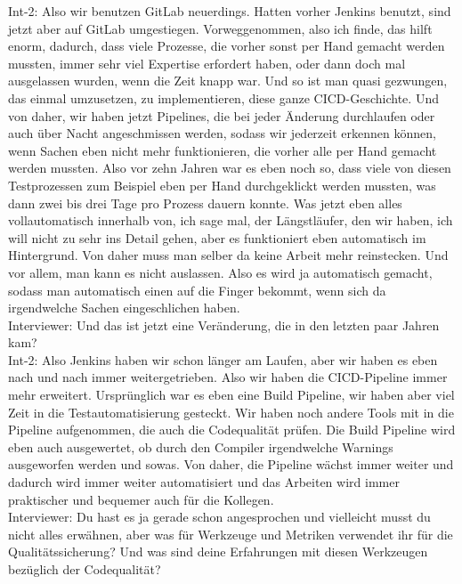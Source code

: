 Int-2: Also wir benutzen GitLab neuerdings. Hatten vorher Jenkins benutzt, sind jetzt aber auf GitLab umgestiegen. Vorweggenommen, also ich finde, das hilft enorm, dadurch, dass viele Prozesse, die vorher sonst per Hand gemacht werden mussten, immer sehr viel Expertise erfordert haben, oder dann doch mal ausgelassen wurden, wenn die Zeit knapp war. Und so ist man quasi gezwungen, das einmal umzusetzen, zu implementieren, diese ganze CICD-Geschichte. Und von daher, wir haben jetzt Pipelines, die bei jeder Änderung durchlaufen oder auch über Nacht angeschmissen werden, sodass wir jederzeit erkennen können, wenn Sachen eben nicht mehr funktionieren, die vorher alle per Hand gemacht werden mussten. Also vor zehn Jahren war es eben noch so, dass viele von diesen Testprozessen zum Beispiel eben per Hand durchgeklickt werden mussten, was dann zwei bis drei Tage pro Prozess dauern konnte. Was jetzt eben alles vollautomatisch innerhalb von, ich sage mal, der Längstläufer, den wir haben, ich will nicht zu sehr ins Detail gehen, aber es funktioniert eben automatisch im Hintergrund. Von daher muss man selber da keine Arbeit mehr reinstecken. Und vor allem, man kann es nicht auslassen. Also es wird ja automatisch gemacht, sodass man automatisch einen auf die Finger bekommt, wenn sich da irgendwelche Sachen eingeschlichen haben. \\
Interviewer: Und das ist jetzt eine Veränderung, die in den letzten paar Jahren kam?\\
Int-2: Also Jenkins haben wir schon länger am Laufen, aber wir haben es eben nach und nach immer weitergetrieben. Also wir haben die CICD-Pipeline immer mehr erweitert. Ursprünglich war es eben eine Build Pipeline, wir haben aber viel Zeit in die Testautomatisierung gesteckt. Wir haben noch andere Tools mit in die Pipeline aufgenommen, die auch die Codequalität prüfen. Die Build Pipeline wird eben auch ausgewertet, ob durch den Compiler irgendwelche Warnings ausgeworfen werden und sowas. Von daher, die Pipeline wächst immer weiter und dadurch wird immer weiter automatisiert und das Arbeiten wird immer praktischer und bequemer auch für die Kollegen. \\
Interviewer: Du hast es ja gerade schon angesprochen und vielleicht musst du nicht alles erwähnen, aber was für Werkzeuge und Metriken verwendet ihr für die Qualitätssicherung? Und was sind deine Erfahrungen mit diesen Werkzeugen bezüglich der Codequalität?\\
